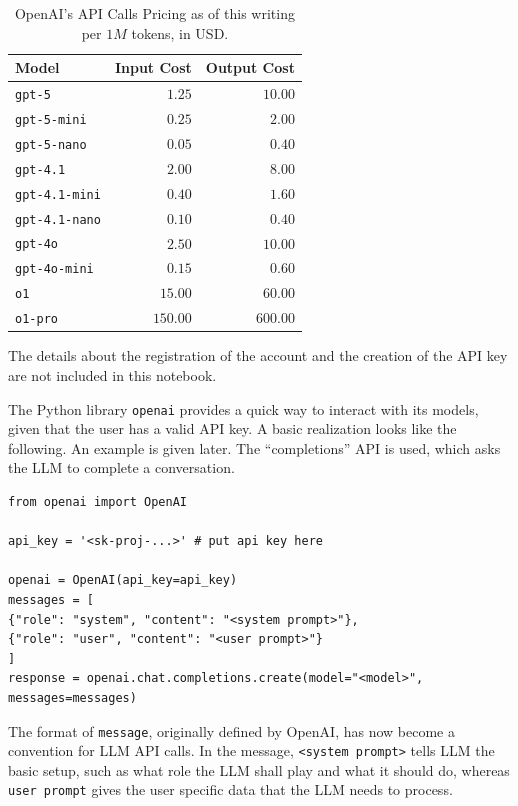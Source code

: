 \begin{table}
	\centering \caption{OpenAI's API Calls Pricing as of this writing per $1M$ tokens, in USD.}\label{tab:openai_api_price}
	\begin{tabular}{lrr}
		\hline
		Model & Input Cost & Output Cost \\ \hline
        \texttt{gpt-5} & $1.25$ & $10.00$ \\
        \texttt{gpt-5-mini} & $0.25$ & $2.00$ \\
        \texttt{gpt-5-nano} & $0.05$ & $0.40$ \\
        \texttt{gpt-4.1} & $2.00$ & $8.00$ \\
        \texttt{gpt-4.1-mini} & $0.40$ & $1.60$ \\
        \texttt{gpt-4.1-nano} & $0.10$ & $0.40$ \\
        \texttt{gpt-4o} & $2.50$ & $10.00$ \\
        \texttt{gpt-4o-mini} & $0.15$ & $0.60$ \\
        \texttt{o1} & $15.00$ & $60.00$ \\
        \texttt{o1-pro} & $150.00$ & $600.00$ \\
		\hline
	\end{tabular}
\end{table}

The details about the registration of the account and the creation of the API key are not included in this notebook.

The Python library \verb|openai| provides a quick way to interact with its models, given that the user has a valid API key. A basic realization looks like the following. An example is given later. The ``completions'' API is used, which asks the LLM to complete a conversation.
\begin{lstlisting}
from openai import OpenAI

api_key = '<sk-proj-...>' # put api key here

openai = OpenAI(api_key=api_key)
messages = [
{"role": "system", "content": "<system prompt>"},
{"role": "user", "content": "<user prompt>"}
]
response = openai.chat.completions.create(model="<model>", messages=messages)
\end{lstlisting}

The format of \verb|message|, originally defined by OpenAI, has now become a convention for LLM API calls. In the message, \verb|<system prompt>| tells LLM the basic setup, such as what role the LLM shall play and what it should do, whereas \verb|user prompt| gives the user specific data that the LLM needs to process.

